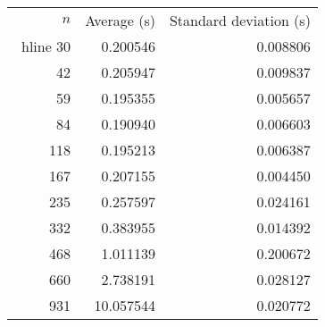 \begin{tabular}{rrr}
$n$& Average (s) & Standard deviation (s)\\\ hline
30& 0.200546& 0.008806\\
42& 0.205947& 0.009837\\
59& 0.195355& 0.005657\\
84& 0.190940& 0.006603\\
118& 0.195213& 0.006387\\
167& 0.207155& 0.004450\\
235& 0.257597& 0.024161\\
332& 0.383955& 0.014392\\
468& 1.011139& 0.200672\\
660& 2.738191& 0.028127\\
931& 10.057544& 0.020772\\
\end{tabular}
